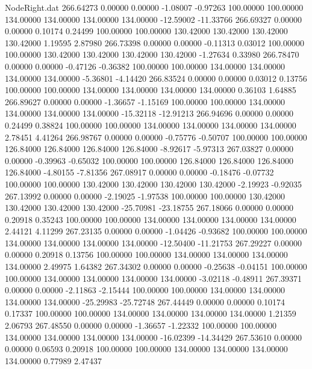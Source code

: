 \begin{filecontents}{NodeRight.dat}
 266.64273    0.00000    0.00000    -1.08007   -0.97263  100.00000  100.00000  134.00000  134.00000  134.00000  134.00000  -12.59002  -11.33766
 266.69327    0.00000    0.00000     0.10174    0.24499  100.00000  100.00000  130.42000  130.42000  130.42000  130.42000    1.19595    2.87980
 266.73398    0.00000    0.00000    -0.11313    0.03012  100.00000  100.00000  130.42000  130.42000  130.42000  130.42000   -1.27634    0.33980
 266.78470    0.00000    0.00000    -0.47126   -0.36382  100.00000  100.00000  134.00000  134.00000  134.00000  134.00000   -5.36801   -4.14420
 266.83524    0.00000    0.00000     0.03012    0.13756  100.00000  100.00000  134.00000  134.00000  134.00000  134.00000    0.36103    1.64885
 266.89627    0.00000    0.00000    -1.36657   -1.15169  100.00000  100.00000  134.00000  134.00000  134.00000  134.00000  -15.32118  -12.91213
 266.94696    0.00000    0.00000     0.24499    0.38824  100.00000  100.00000  134.00000  134.00000  134.00000  134.00000    2.78451    4.41264
 266.98767    0.00000    0.00000    -0.75776   -0.50707  100.00000  100.00000  126.84000  126.84000  126.84000  126.84000   -8.92617   -5.97313
 267.03827    0.00000    0.00000    -0.39963   -0.65032  100.00000  100.00000  126.84000  126.84000  126.84000  126.84000   -4.80155   -7.81356
 267.08917    0.00000    0.00000    -0.18476   -0.07732  100.00000  100.00000  130.42000  130.42000  130.42000  130.42000   -2.19923   -0.92035
 267.13992    0.00000    0.00000    -2.19025   -1.97538  100.00000  100.00000  130.42000  130.42000  130.42000  130.42000  -25.70981  -23.18755
 267.18066    0.00000    0.00000     0.20918    0.35243  100.00000  100.00000  134.00000  134.00000  134.00000  134.00000    2.44121    4.11299
 267.23135    0.00000    0.00000    -1.04426   -0.93682  100.00000  100.00000  134.00000  134.00000  134.00000  134.00000  -12.50400  -11.21753
 267.29227    0.00000    0.00000     0.20918    0.13756  100.00000  100.00000  134.00000  134.00000  134.00000  134.00000    2.49975    1.64382
 267.34302    0.00000    0.00000    -0.25638   -0.04151  100.00000  100.00000  134.00000  134.00000  134.00000  134.00000   -3.02118   -0.48911
 267.39371    0.00000    0.00000    -2.11863   -2.15444  100.00000  100.00000  134.00000  134.00000  134.00000  134.00000  -25.29983  -25.72748
 267.44449    0.00000    0.00000     0.10174    0.17337  100.00000  100.00000  134.00000  134.00000  134.00000  134.00000    1.21359    2.06793
 267.48550    0.00000    0.00000    -1.36657   -1.22332  100.00000  100.00000  134.00000  134.00000  134.00000  134.00000  -16.02399  -14.34429
 267.53610    0.00000    0.00000     0.06593    0.20918  100.00000  100.00000  134.00000  134.00000  134.00000  134.00000    0.77989    2.47437

\end{filecontents}
